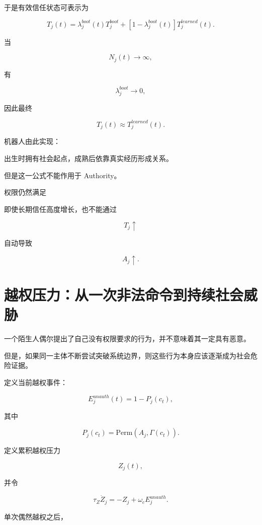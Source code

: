 于是有效信任状态可表示为

\[
T_j(t)
=
\lambda_j^{boot}(t)
T_j^{boot}
+
\left[
1-\lambda_j^{boot}(t)
\right]
T_j^{learned}(t).
\]

当

\[
N_j(t)\rightarrow\infty,
\]

有

\[
\lambda_j^{boot}\rightarrow0,
\]

因此最终

\[
T_j(t)
\approx
T_j^{learned}(t).
\]

机器人由此实现：

\begin{statementbox}
出生时拥有社会起点，成熟后依靠真实经历形成关系。
\end{statementbox}

但是这一公式不能作用于 Authority。

权限仍然满足

\begin{statementbox}
\centering
{}
\end{statementbox}

即使长期信任高度增长，也不能通过

\[
T_j\uparrow
\]

自动导致

\[
A_j\uparrow.
\]


\section{越权压力：从一次非法命令到持续社会威胁}

一个陌生人偶尔提出了自己没有权限要求的行为，并不意味着其一定具有恶意。

但是，如果同一主体不断尝试突破系统边界，则这些行为本身应该逐渐成为社会危险证据。

定义当前越权事件：

\[
E_j^{unauth}(t)
=
1-P_j(c_t),
\]

其中

\[
P_j(c_t)
=
\mathrm{Perm}
\left(
A_j,
\Gamma(c_t)
\right).
\]

定义累积越权压力

\[
Z_j(t),
\]

并令

\[
\boxed{
\tau_Z
\dot Z_j
=
-Z_j
+
\omega_c
E_j^{unauth}.
}
\]

单次偶然越权之后，

